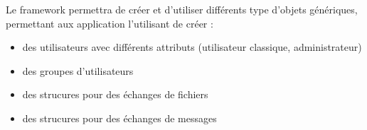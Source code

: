 Le framework permettra de créer et d'utiliser différents type d'objets génériques, permettant aux application l'utilisant de créer :

\begin{itemize}
\item{des utilisateurs avec différents attributs (utilisateur classique, administrateur)}
\item{des groupes d'utilisateurs}
\item{des strucures pour des échanges de fichiers}
\item{des strucures pour des échanges de messages}
\end{itemize}

